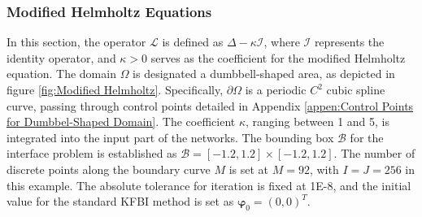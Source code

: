 \documentclass{article}
\begin{document}
\subsubsection{Modified Helmholtz Equations} \label{Modified Helmholtz Equations}
In this section, the operator $\mathcal{L}$ is defined as $\Delta - \kappa \mathcal{I}$, where $\mathcal{I}$ represents the identity operator, and $\kappa > 0$ serves as the coefficient for the modified Helmholtz equation. The domain $\Omega$ is designated a dumbbell-shaped area, as depicted in figure \ref{fig:Modified Helmholtz}. Specifically, $\partial \Omega$ is a periodic $C^2$ cubic spline curve, passing through control points detailed in Appendix \ref{appen:Control Points for Dumbbel-Shaped Domain}. The coefficient $\kappa$, ranging between 1 and 5, is integrated into the input part of the networks. The bounding box $\mathcal{B}$ for the interface problem is established as $\mathcal{B} = [-1.2,1.2] \times [-1.2,1.2]$. The number of discrete points along the boundary curve $M$ is set at $M = 92$, with $I = J = 256$ in this example. The absolute tolerance for iteration is fixed at 1E-8, and the initial value for the standard KFBI method is set as $\mathbf{\varphi}_0 = (0, 0)^T$.
\end{document}
